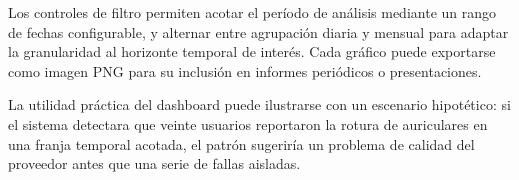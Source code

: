 Los controles de filtro permiten acotar el período de análisis mediante un rango de fechas configurable, y alternar entre agrupación diaria y mensual para adaptar la granularidad al horizonte temporal de interés. Cada gráfico puede exportarse como imagen PNG para su inclusión en informes periódicos o presentaciones.

La utilidad práctica del dashboard puede ilustrarse con un escenario hipotético: si el sistema detectara que veinte usuarios reportaron la rotura de auriculares en una franja temporal acotada, el patrón sugeriría un problema de calidad del proveedor antes que una serie de fallas aisladas.

\newpage
